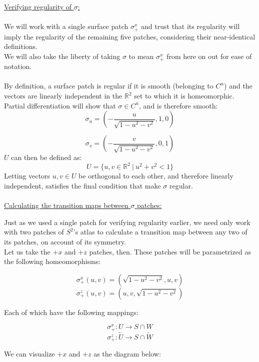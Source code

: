 \documentclass[12pt]{article}
\begin{document}
\clearpage

\underline{Verifying regularity of $\sigma$:}\\\\
\indent
We will work with a single surface patch $\sigma^x_+$ and trust that its regularity will imply the regularity of the remaining five patches, considering their near-identical definitions.\\
\indent
We will also take the liberty of taking $\sigma$ to mean $\sigma^x_+$  from here on out for ease of notation.\\\\
\indent
By definition, a surface patch is regular if it is smooth (belonging to $C^n$) and the vectors are linearly independent in the $\mathbb{R}^2$ set to which it is homeomorphic.\\
\indent
Partial differentiation will show that  $\sigma \in C^n$, and is therefore smooth:
$$
\sigma_u = \left(-\frac{u}{\sqrt{1-u^2-v^2}}, 1 ,0 \right)
$$

$$
\sigma_v = \left(-\frac{v}{\sqrt{1-u^2-v^2}}, 0 ,1 \right)
$$
\indent
$U$ can then be defined as:
$$
U = \lbrace u,v \in \mathbb{R}^2 \ | \ u^2 + v^2 < 1 \rbrace
$$
\indent
Letting vectors $u, v \in U$ be orthogonal to each other, and therefore linearly independent, satisfies the final condition that make $\sigma$ regular.\\\\

\underline{Calculating the transition maps between $\sigma$ patches:}\\
\indent

Just as we used a single patch for verifying regularity earlier, we need only work with two patches of $S^2$'s atlas to calculate a transition map between any two of its patches, on account of its symmetry.\\

Let us take the $+x$ and $+z$ patches, then. These patches will be parametrized as the following homeomorphisms:

$$
\sigma^{x}_{+}(u,v) = (\sqrt{1-u^2-v^2}, u ,v)
$$
$$
\sigma^{z}_{+}(u,v) = (u ,v, \sqrt{1-u^2-v^2})
$$

Each of which have the following mappings:

$$
\sigma^{x}_{+} : U \rightarrow S \cap W
$$
$$
\sigma^{z}_{+} : \widetilde{U} \rightarrow S \cap \widetilde{W}
$$

\clearpage

We can visualize $+x$ and $+z$ as the diagram below:
\end{document}
